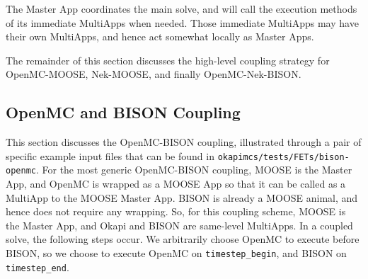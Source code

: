 \documentclass[10pt]{article}
\numberwithin{equation}{section} %
\begin{document}
The Master App coordinates the main solve, and will call the execution methods of its immediate MultiApps when needed. Those immediate MultiApps may have their own MultiApps, and hence act somewhat locally as Master Apps. 

The remainder of this section discusses the high-level coupling strategy for OpenMC-MOOSE, Nek-MOOSE, and finally OpenMC-Nek-BISON. 

\subsection{OpenMC and BISON Coupling}
This section discusses the OpenMC-BISON coupling, illustrated through a pair of specific example input files that can be found in {\tt okapimcs/tests/FETs/bison-openmc}. For the most generic OpenMC-BISON coupling, MOOSE is the Master App, and OpenMC is wrapped as a MOOSE App so that it can be called as a MultiApp to the MOOSE Master App. BISON is already a MOOSE animal, and hence does not require any wrapping. So, for this coupling scheme, MOOSE is the Master App, and Okapi and BISON are same-level MultiApps. In a coupled solve, the following steps occur. We arbitrarily choose OpenMC to execute before BISON, so we choose to execute OpenMC on {\tt timestep\_begin}, and BISON on {\tt timestep\_end}. 
\end{document}
